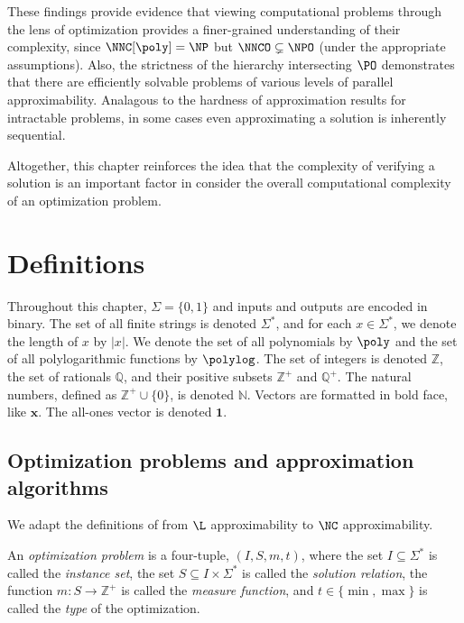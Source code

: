 %
%
%
These findings provide evidence that viewing computational problems through the lens of optimization provides a finer-grained understanding of their complexity, since $\NNC[\poly] = \NP$ but $\NNCO \subsetneq \NPO$ (under the appropriate assumptions).
Also, the strictness of the hierarchy intersecting $\PO$ demonstrates that there are efficiently solvable problems of various levels of parallel approximability.
Analagous to the hardness of approximation results for intractable problems, in some cases even approximating a solution is inherently sequential.

%
%
Altogether, this chapter reinforces the idea that the complexity of verifying a solution is an important factor in consider the overall computational complexity of an optimization problem.

\section{Definitions}

Throughout this chapter, $\Sigma=\{0, 1\}$ and inputs and outputs are encoded in binary.
The set of all finite strings is denoted $\Sigma^*$, and for each $x \in \Sigma^*$, we denote the length of $x$ by $|x|$.
We denote the set of all polynomials by $\poly$ and the set of all polylogarithmic functions by $\polylog$.
The set of integers is denoted $\mathbb{Z}$, the set of rationals $\mathbb{Q}$, and their positive subsets $\mathbb{Z}^+$ and $\mathbb{Q}^+$.
The natural numbers, defined as $\mathbb{Z}^+ \cup \{0\}$, is denoted $\mathbb{N}$.
Vectors are formatted in bold face, like $\mathbf{x}$.
The all-ones vector is denoted $\mathbf{1}$.

\subsection{Optimization problems and approximation algorithms}

We adapt the definitions of \cite{tantau07} from $\L$ approximability to $\NC$ approximability.

\begin{definition}
  An \emph{optimization problem} is a four-tuple, $(I, S, m, t)$, where the set $I \subseteq \Sigma^*$ is called the \emph{instance set}, the set $S \subseteq I \times \Sigma^*$ is called the \emph{solution relation}, the function $m \colon S \to \mathbb{Z}^+$ is called the \emph{measure function}, and $t \in \{\min, \max\}$ is called the \emph{type} of the optimization.
\end{definition}

